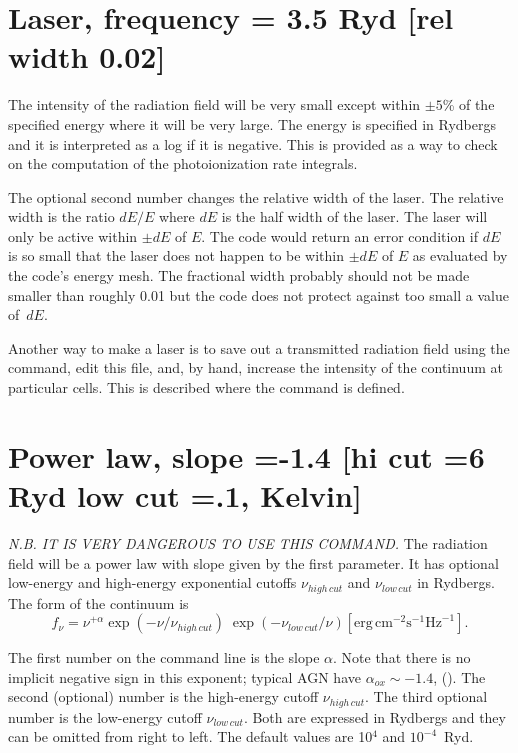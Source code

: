\section{Laser, frequency = 3.5 Ryd [rel width 0.02]}

The intensity of the radiation field will be very small
except within $\pm5$\% of the specified energy where it will be very large. The energy is specified
in Rydbergs and it is interpreted as a log if it is negative.
This is
provided as a way to check on the computation of the photoionization rate
integrals.

The optional second number changes the relative width of the laser.
The relative width is the ratio $dE/E$ where $dE$ is
the half width of the laser.
The laser will only be active within $\pm  dE$ of $E$.
The code would return
an error condition if $dE$ is so small that the laser does not
happen to be
within $\pm  dE$ of $E$ as evaluated by the code's energy mesh.
The fractional
width probably should not be made smaller than roughly 0.01 but the code
does not protect against too small a value of~$dE$.

Another way to make a laser is to save out a transmitted radiation field using the  command,
edit this file, and, by hand, increase the intensity of the continuum at
particular cells.  This is described where the  command is defined.

\section{Power law, slope =-1.4 [hi cut =6 Ryd low cut =.1, Kelvin]}
\label{sec:CommandPowerLaw}

\emph{N.B. IT IS VERY DANGEROUS TO USE THIS COMMAND.}
The radiation field will be
a power law with slope given by the first parameter.
It has optional
low-energy and high-energy exponential cutoffs $\nu_{high\, cut}$
and $\nu_{low\, cut}$ in Rydbergs.
The form of the continuum is
\begin{equation}
f_\nu   = \nu ^{ + \alpha } \exp \left( { - \nu /\nu _{high\,cut} }
\right)\;\exp \left( { - \nu _{low\, cut} /\nu } \right)
 [\mathrm{erg\, cm}^{-2} \mathrm{s}^{-1} \mathrm{Hz}^{-1}].
\end{equation}

The first number on the command line is the slope $\alpha$.
Note that there
is no implicit negative sign in this exponent;
typical AGN have $\alpha_{ox}\sim -1.4$,
(\citealp{Zamorani1981}).
The second (optional) number is the high-energy cutoff $\nu_{high\, cut}$.
The third optional number is the low-energy
cutoff $\nu_{low\,cut}$.
Both are expressed in Rydbergs and they
can be omitted from right to left.
The default values are 10$^4$ and $10^{-4}$~Ryd.

